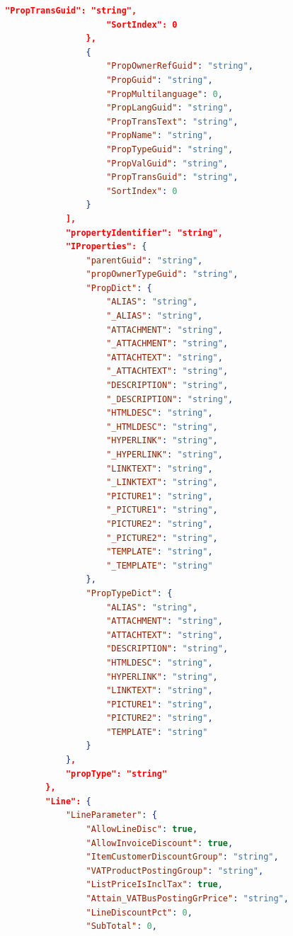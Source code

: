 \begin{lstlisting}[language=json]
                    "PropTransGuid": "string",
                    "SortIndex": 0
                },
                {
                    "PropOwnerRefGuid": "string",
                    "PropGuid": "string",
                    "PropMultilanguage": 0,
                    "PropLangGuid": "string",
                    "PropTransText": "string",
                    "PropName": "string",
                    "PropTypeGuid": "string",
                    "PropValGuid": "string",
                    "PropTransGuid": "string",
                    "SortIndex": 0
                }
            ],
            "propertyIdentifier": "string",
            "IProperties": {
                "parentGuid": "string",
                "propOwnerTypeGuid": "string",
                "PropDict": {
                    "ALIAS": "string",
                    "_ALIAS": "string",
                    "ATTACHMENT": "string",
                    "_ATTACHMENT": "string",
                    "ATTACHTEXT": "string",
                    "_ATTACHTEXT": "string",
                    "DESCRIPTION": "string",
                    "_DESCRIPTION": "string",
                    "HTMLDESC": "string",
                    "_HTMLDESC": "string",
                    "HYPERLINK": "string",
                    "_HYPERLINK": "string",
                    "LINKTEXT": "string",
                    "_LINKTEXT": "string",
                    "PICTURE1": "string",
                    "_PICTURE1": "string",
                    "PICTURE2": "string",
                    "_PICTURE2": "string",
                    "TEMPLATE": "string",
                    "_TEMPLATE": "string"
                },
                "PropTypeDict": {
                    "ALIAS": "string",
                    "ATTACHMENT": "string",
                    "ATTACHTEXT": "string",
                    "DESCRIPTION": "string",
                    "HTMLDESC": "string",
                    "HYPERLINK": "string",
                    "LINKTEXT": "string",
                    "PICTURE1": "string",
                    "PICTURE2": "string",
                    "TEMPLATE": "string"
                }
            },
            "propType": "string"
        },
        "Line": {
            "LineParameter": {
                "AllowLineDisc": true,
                "AllowInvoiceDiscount": true,
                "ItemCustomerDiscountGroup": "string",
                "VATProductPostingGroup": "string",
                "ListPriceIsInclTax": true,
                "Attain_VATBusPostingGrPrice": "string",
                "LineDiscountPct": 0,
                "SubTotal": 0,

\end{lstlisting}
